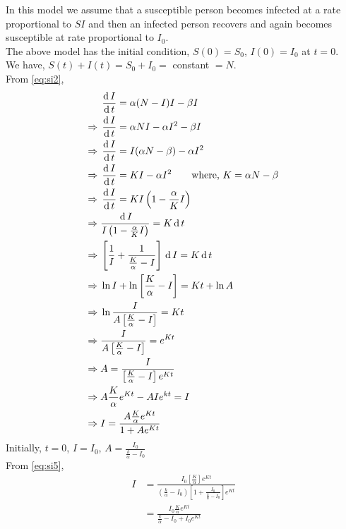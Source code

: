 \documentclass[../main-sheet.tex]{subfiles}
\begin{document}
\begin{soln}
    In this model we assume that a susceptible person becomes infected at a rate proportional to \(SI\) and then an infected person recovers and again becomes susceptible at rate proportional to \(I_0\).\\
    The above model has the initial condition, \(S(0)=S_0\), \(I(0)=I_0\) at \(t=0\).\\
    We have, \(S(t)+I(t)=S_0+I_0=\) constant \(=N\).\\
    From \eqref{eq:si2},
    \begin{align}
        &\,\frac{\mathrm{d}\,I}{\mathrm{d}\,t}=\alpha (N-I)I-\beta I\notag\\
        \Rightarrow\;&\,\frac{\mathrm{d}\,I}{\mathrm{d}\,t}=\alpha NI-\alpha I^2-\beta I\notag\\
        \Rightarrow\;&\,\frac{\mathrm{d}\,I}{\mathrm{d}\,t}=I(\alpha N-\beta)-\alpha I^2\notag\\
        \Rightarrow\;&\,\frac{\mathrm{d}\,I}{\mathrm{d}\,t}=K I-\alpha I^2\qquad \text{where, }K=\alpha N-\beta\notag\\
        \Rightarrow\;&\,\frac{\mathrm{d}\,I}{\mathrm{d}\,t}=KI\left( 1-\frac{\alpha}{K}I \right)\notag\\
        \Rightarrow\;&\frac{\,\mathrm{d}\, I}{I\left( 1-\frac{\alpha}{K}I \right)}=K\,\mathrm{d}\, t\notag\\
        \Rightarrow\;&\left[ \frac{1}{I}+\frac{1}{\frac{K}{\alpha}-I} \right]\,\mathrm{d}\, I=K\,\mathrm{d}\, t\notag\\
        \Rightarrow\;&\ln{I}+\ln\left[\frac{K}{\alpha}-I \right]=Kt+\ln A\notag\\
        \Rightarrow\;& \ln \frac{I}{A\left[ \frac{K}{\alpha}-I \right]}=Kt\notag\\
        \Rightarrow\;& \frac{I}{A\left[ \frac{K}{\alpha}-I \right]}=e^{Kt}\notag\\
        \Rightarrow\;& A=\frac{I}{\left[ \frac{K}{\alpha}-I \right]e^{Kt}}\label{eq:si4}\\
        \Rightarrow\;& A\frac{K}{\alpha}e^{Kt}-AIe^{kt}=I\notag\\
        \Rightarrow\;& I=\frac{A\frac{K}{\alpha}e^{Kt}}{1+Ae^{Kt}}\label{eq:si5}
    \end{align}
    Initially, \(t=0\), \(I=I_0\), \(A=\frac{I_0}{\frac{k}{\alpha}-I_0}\)\\
    From \eqref{eq:si5},
    \begin{align*}
        I&=\frac{I_0 \left[\frac{K}{\alpha}\right]e^{Kt}}{\left(\frac{k}{\alpha}-I_0\right) \left[1+\frac{I_0}{\frac{k}{\alpha}-I_0}\right]e^{Kt}}\\
        &=\frac{I_0 \frac{K}{\alpha}e^{Kt}}{\frac{k}{\alpha}-I_0+{I_0}e^{Kt}}\\

\end{align*}
\end{soln}
\end{document}
